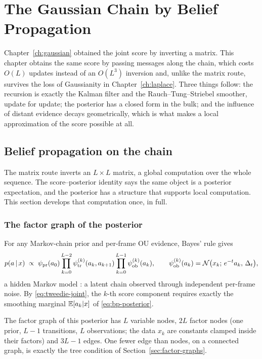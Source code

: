 \chapter{The Gaussian Chain by Belief Propagation}\label{ch:gaussian-bp}

Chapter~\ref{ch:gaussian} obtained the joint score by inverting a matrix. This
chapter obtains the same score by passing messages along the chain, which costs
$O(L)$ updates instead of an $O(L^3)$ inversion and, unlike the matrix route,
survives the loss of Gaussianity in Chapter~\ref{ch:laplace}. Three things
follow: the recursion is exactly the Kalman filter and the
Rauch--Tung--Striebel smoother, update for update; the posterior has a closed
form in the bulk; and the influence of distant evidence decays geometrically,
which is what makes a local approximation of the score possible at all.

\section{Belief propagation on the chain}\label{sec:bp-chain}\label{sec:bp-problem}

The matrix route inverts an $L \times L$ matrix, a global computation
over the whole sequence. The score--posterior identity says the same object is a posterior
expectation, and the posterior has a structure that supports local
computation. This section develops that computation once, in full.

\subsection{The factor graph of the posterior}

For any Markov-chain prior and per-frame OU evidence, Bayes' rule gives
\begin{equation}
  p(a \,|\, x) \;\propto\;
  \psi_{\mathrm{pr}}(a_0)
  \prod_{k=0}^{L-2} \psi^{(k)}_{\mathrm{tr}}(a_k, a_{k+1})
  \prod_{k=0}^{L-1} \psi^{(k)}_{\mathrm{ob}}(a_k),
  \qquad
  \psi^{(k)}_{\mathrm{ob}}(a_k) = \mathcal{N}\big(x_k;\, e^{-t}a_k,\, \Delta_t\big),
  \label{eq:bp-posterior}
\end{equation}
a hidden Markov model \citep{rabiner1989tutorial}: a latent chain observed
through independent per-frame noise. By \eqref{eq:tweedie-joint}, the
$k$-th score component requires exactly the smoothing marginal
$\mathbb{E}[a_k | x]$ of \eqref{eq:bp-posterior}.

The factor graph of this posterior has $L$ variable nodes, $2L$ factor nodes
(one prior, $L{-}1$ transitions, $L$ observations; the data $x_k$ are constants
clamped inside their factors) and $3L - 1$ edges. One fewer edge than nodes, on
a connected graph, is exactly the tree condition of
Section~\ref{sec:factor-graphs}.


